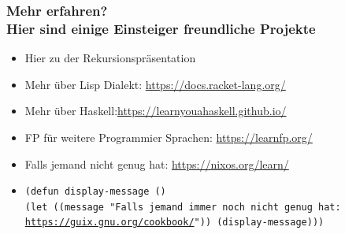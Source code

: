 \documentclass{beamer}
\def\code#1{\texttt{#1}}
\begin{document}
\begin{frame}
\centering
\frametitle{Mehr erfahren? \\ Hier sind einige Einsteiger freundliche Projekte}
\begin{itemize}
	\item Hier zu der Rekursionspräsentation
    \item Mehr über Lisp Dialekt: \url{https://docs.racket-lang.org/}
    \item Mehr über Haskell:\url{https://learnyouahaskell.github.io/}
     \item FP für weitere Programmier Sprachen: \url{https://learnfp.org/}
    \item Falls jemand nicht genug hat: \url{https://nixos.org/learn/}
    \item \code{(defun display-message () \\
  (let ((message "Falls jemand immer noch nicht genug hat: \url{https://guix.gnu.org/cookbook/}"))
(display-message)))}

\end{itemize}

\end{frame}
\end{document}
